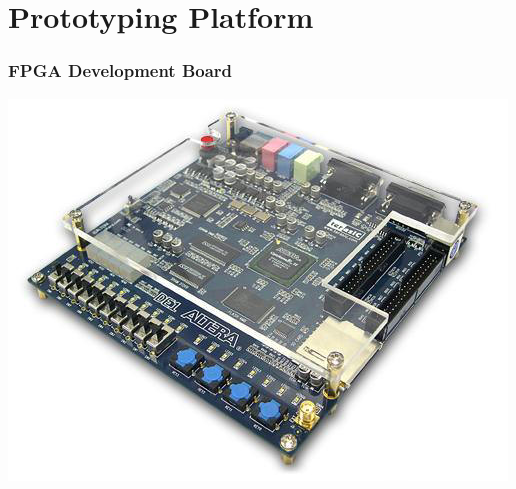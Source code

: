 \documentclass{beamer}
\begin{document}
\section{Prototyping Platform}
\begin{frame}
    \frametitle{FPGA Development Board}
    \begin{center}
        \includegraphics[height=0.7\textheight]{../images/de1_angle.jpg}
    \end{center}
\end{frame}
\end{document}
